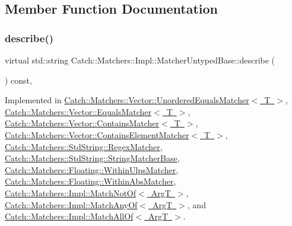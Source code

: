 \subsection{Member Function Documentation}
\mbox{\label{class_catch_1_1_matchers_1_1_impl_1_1_matcher_untyped_base_a91d3a907dbfcbb596077df24f6e11fe2}} 
\subsubsection{\texorpdfstring{describe()}{describe()}}
{\footnotesize\ttfamily virtual std\+::string Catch\+::\+Matchers\+::\+Impl\+::\+Matcher\+Untyped\+Base\+::describe (\begin{DoxyParamCaption}{ }\end{DoxyParamCaption}) const\hspace{0.3cm}{\ttfamily [protected]}, {}}



Implemented in \mbox{\hyperlink{struct_catch_1_1_matchers_1_1_vector_1_1_unordered_equals_matcher_a7202d811200317abc58c844f663823df}{Catch\+::\+Matchers\+::\+Vector\+::\+Unordered\+Equals\+Matcher$<$ T $>$}}, \mbox{\hyperlink{struct_catch_1_1_matchers_1_1_vector_1_1_equals_matcher_a36b5f7ecada4081d6c65bebe8ddea6f4}{Catch\+::\+Matchers\+::\+Vector\+::\+Equals\+Matcher$<$ T $>$}}, \mbox{\hyperlink{struct_catch_1_1_matchers_1_1_vector_1_1_contains_matcher_abe6a9ea3d6506c9a1f75ff524f35832e}{Catch\+::\+Matchers\+::\+Vector\+::\+Contains\+Matcher$<$ T $>$}}, \mbox{\hyperlink{struct_catch_1_1_matchers_1_1_vector_1_1_contains_element_matcher_aea3b674389a0afd82af6ba4b10f86ae6}{Catch\+::\+Matchers\+::\+Vector\+::\+Contains\+Element\+Matcher$<$ T $>$}}, \mbox{\hyperlink{struct_catch_1_1_matchers_1_1_std_string_1_1_regex_matcher_a1f788cd5258c987e5043f6c7f43adeb9}{Catch\+::\+Matchers\+::\+Std\+String\+::\+Regex\+Matcher}}, \mbox{\hyperlink{struct_catch_1_1_matchers_1_1_std_string_1_1_string_matcher_base_a47af030f8cea42a601ffb1000eea5cca}{Catch\+::\+Matchers\+::\+Std\+String\+::\+String\+Matcher\+Base}}, \mbox{\hyperlink{struct_catch_1_1_matchers_1_1_floating_1_1_within_ulps_matcher_ad9bc8bb7f3abd326580a4bf6cf369b1b}{Catch\+::\+Matchers\+::\+Floating\+::\+Within\+Ulps\+Matcher}}, \mbox{\hyperlink{struct_catch_1_1_matchers_1_1_floating_1_1_within_abs_matcher_a206a738680f8767af31d3f1835afff3f}{Catch\+::\+Matchers\+::\+Floating\+::\+Within\+Abs\+Matcher}}, \mbox{\hyperlink{struct_catch_1_1_matchers_1_1_impl_1_1_match_not_of_ac5fb4ef6a9069d23a4098c3c818f06b0}{Catch\+::\+Matchers\+::\+Impl\+::\+Match\+Not\+Of$<$ Arg\+T $>$}}, \mbox{\hyperlink{struct_catch_1_1_matchers_1_1_impl_1_1_match_any_of_a315285204df93d1f8e72f50dd66eb709}{Catch\+::\+Matchers\+::\+Impl\+::\+Match\+Any\+Of$<$ Arg\+T $>$}}, and \mbox{\hyperlink{struct_catch_1_1_matchers_1_1_impl_1_1_match_all_of_acbb9a083e93b546fd33c9235b644c40f}{Catch\+::\+Matchers\+::\+Impl\+::\+Match\+All\+Of$<$ Arg\+T $>$}}.

